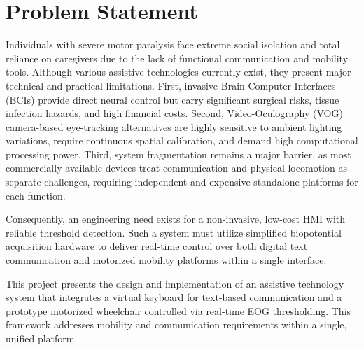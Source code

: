 \section{Problem Statement}
\label{sec:problem_statement}

Individuals with severe motor paralysis face extreme social isolation and total reliance on caregivers due to the lack of functional communication and mobility tools. Although various assistive technologies currently exist, they present major technical and practical limitations. First, invasive Brain-Computer Interfaces (BCIs) provide direct neural control but carry significant surgical risks, tissue infection hazards, and high financial costs. Second, Video-Oculography (VOG) camera-based eye-tracking alternatives are highly sensitive to ambient lighting variations, require continuous spatial calibration, and demand high computational processing power. Third, system fragmentation remains a major barrier, as most commercially available devices treat communication and physical locomotion as separate challenges, requiring independent and expensive standalone platforms for each function.


Consequently, an engineering need exists for a non-invasive, low-cost HMI with reliable threshold detection. Such a system must utilize simplified biopotential acquisition hardware to deliver real-time control over both digital text communication and motorized mobility platforms within a single interface.

This project presents the design and implementation of an assistive technology system that integrates a virtual keyboard for text-based communication and a prototype motorized wheelchair controlled via real-time EOG thresholding. This framework addresses mobility and communication requirements within a single, unified platform.

